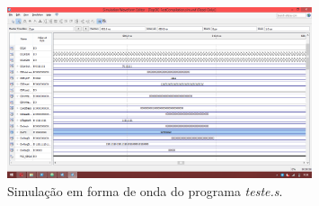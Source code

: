 \documentclass[12pt, a4paper, twoside]{article}
\begin{document}
\begin{figure}
    \centering
    \includegraphics[width=0.8\textwidth]{./figs/sims.png}
    \caption{Simulação em forma de onda do programa \textit{teste.s}.}
\end{figure}

%
%
%
%
%
%
%
\end{document}
